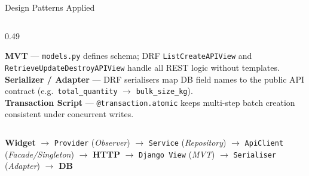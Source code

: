 \documentclass[aspectratio=169,12pt]{beamer}
\begin{document}
\begin{frame}{Design Patterns Applied}
\begin{columns}[T]
\begin{column}{0.49\textwidth}
  \begin{tcolorbox}[orangecard,title={Architectural Patterns (Django)}]
    \scriptsize
    \textbf{MVT} --- \texttt{models.py} defines schema; DRF \texttt{ListCreateAPIView} and \texttt{RetrieveUpdateDestroyAPIView} handle all REST logic without templates.\\[3pt]
    \textbf{Serializer / Adapter} --- DRF serialisers map DB field names to the public API contract (e.g.\ \texttt{total\_quantity} $\to$ \texttt{bulk\_size\_kg}).\\[3pt]
    \textbf{Transaction Script} --- \texttt{@transaction.atomic} keeps multi-step batch creation consistent under concurrent writes.
  \end{tcolorbox}

\end{column}
\end{columns}

\vspace{0.10cm}

\begin{tcolorbox}[tealstat,title={Separation of Concerns --- Runtime Data Flow}]
  \scriptsize
  \textbf{Widget} $\to$ \texttt{Provider} (\textit{Observer}) $\to$ \texttt{Service} (\textit{Repository}) $\to$ \texttt{ApiClient} (\textit{Facade/Singleton}) $\to$ \textbf{HTTP} $\to$ \texttt{Django View} (\textit{MVT}) $\to$ \texttt{Serialiser} (\textit{Adapter}) $\to$ \textbf{DB}
\end{tcolorbox}

\end{frame}
\end{document}
